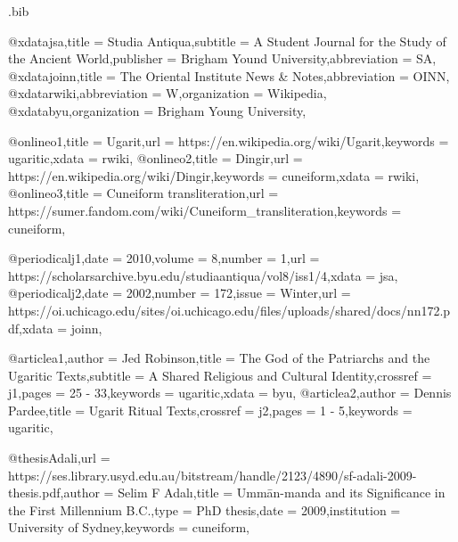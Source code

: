 \begin{filecontents*}[overwrite]{\jobname.bib}

@xdata{jsa,title = {Studia Antiqua},subtitle = {A Student Journal for the Study of the Ancient World},publisher = {Brigham Yound University},abbreviation = {SA},}
@xdata{joinn,title = {The Oriental Institute News \& Notes},abbreviation = {OINN},}
@xdata{rwiki,abbreviation = {W},organization = {Wikipedia},}
@xdata{byu,organization = {Brigham Young University},}


@online{o1,title = {Ugarit},url = {https://en.wikipedia.org/wiki/Ugarit},keywords = {ugaritic},xdata = {rwiki},}
@online{o2,title = {Dingir},url = {https://en.wikipedia.org/wiki/Dingir},keywords = {cuneiform},xdata = {rwiki},}
@online{o3,title = {Cuneiform transliteration},url = {https://sumer.fandom.com/wiki/Cuneiform_transliteration},keywords = {cuneiform},}


@periodical{j1,date = {2010},volume = {8},number = {1},url = {https://scholarsarchive.byu.edu/studiaantiqua/vol8/iss1/4},xdata = {jsa},}
@periodical{j2,date = {2002},number = {172},issue = {Winter},url = {https://oi.uchicago.edu/sites/oi.uchicago.edu/files/uploads/shared/docs/nn172.pdf},xdata = {joinn},}

@article{a1,author = {Jed Robinson},title = {The God of the Patriarchs and the Ugaritic Texts},subtitle = {A Shared Religious and Cultural Identity},crossref = {j1},pages = {25 - 33},keywords = {ugaritic},xdata = {byu},}
@article{a2,author = {Dennis Pardee},title = {Ugarit Ritual Texts},crossref = {j2},pages = {1 - 5},keywords = {ugaritic},}
	
@thesis{Adali,url = {https://ses.library.usyd.edu.au/bitstream/handle/2123/4890/sf-adali-2009-thesis.pdf},author = {Selim F Adalı},title = {Ummān-manda and its Significance in the First Millennium B.C.},type = {PhD thesis},date = {2009},institution = {University of Sydney},keywords = {cuneiform},}

\end{filecontents*}




\documentclass{article}

\usepackage[table]{xcolor}
\pagecolor{green!3}
\newcommand\theadercolour{red!20!yellow}
\usepackage{fontspec}
\usepackage[listings]{tcolorbox}
\usepackage{longtable}
\usepackage[nil,english]{babel}
\usepackage[english=british]{csquotes}
\usepackage{multicol}
\setlength{\columnsep}{0.3cm} \setlength{\columnseprule}{1pt}

